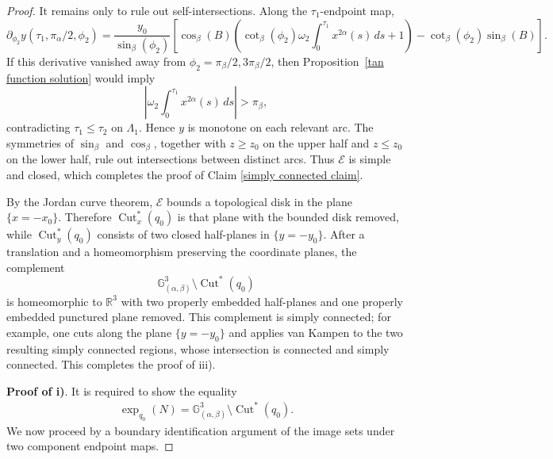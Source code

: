 \documentclass[12pt]{amsart}
\numberwithin{equation}{section}
\theoremstyle{plain}
\theoremstyle{definition}
\theoremstyle{remark}
\begin{document}
\begin{proof}
    It remains only to rule out self-intersections. Along the \(\tau_1\)-endpoint map,
    \[
        \partial_{\phi_2}y(\tau_1,\pi_\alpha/2,\phi_2)
        =
        \frac{y_0}{\sin_\beta(\phi_2)}
        \left[
            \cos_\beta(B)
            \left(
            \cot_\beta(\phi_2)\omega_2
            \int_0^{\tau_1}x^{2\alpha}(s)\,ds
            +1
            \right)
            -
            \cot_\beta(\phi_2)\sin_\beta(B)
            \right].
    \]
    If this derivative vanished away from
    \(\phi_2=\pi_\beta/2,3\pi_\beta/2\), then Proposition~\ref{tan function solution}
    would imply
    \[
        \left|
        \omega_2\int_0^{\tau_1}x^{2\alpha}(s)\,ds
        \right|
        >
        \pi_\beta,
    \]
    contradicting \(\tau_1\leq\tau_2\) on \(\Lambda_1\). Hence \(y\) is monotone on
    each relevant arc. The symmetries of \(\sin_\beta\) and \(\cos_\beta\), together with
    \(z\geq z_0\) on the upper half and \(z\leq z_0\) on the lower half, rule out
    intersections between distinct arcs. Thus \(\mathcal E\) is simple and closed, which completes the proof of Claim \ref{simply connected claim}.

    By the Jordan curve theorem, \(\mathcal E\) bounds a topological disk in the plane
    \(\{x=-x_0\}\). Therefore \(\operatorname{Cut}_x^*(q_0)\) is that plane with the
    bounded disk removed, while \(\operatorname{Cut}_y^*(q_0)\) consists of two closed
    half-planes in \(\{y=-y_0\}\). After a translation and a homeomorphism preserving the
    coordinate planes, the complement
    \[
        \mathbb G^3_{(\alpha,\beta)}\setminus\operatorname{Cut}^*(q_0)
    \]
    is homeomorphic to \(\mathbb R^3\) with two properly embedded half-planes and one
    properly embedded punctured plane removed. This complement is simply connected; for
    example, one cuts along the plane \(\{y=-y_0\}\) and applies van Kampen to the two
    resulting simply connected regions, whose intersection is connected and simply
    connected. This completes the proof of iii).

    \textbf{Proof of i)}. It is required to show the equality
    \begin{align}\label{main set equality}
        \operatorname{exp}_{q_0}(N)=\mathbb{G}^3_{(\alpha,\beta)}\setminus \operatorname{Cut}^*(q_0).
    \end{align}
    We now proceed by a boundary identification argument of the image sets under two component endpoint maps.


\end{proof}
\end{document}
